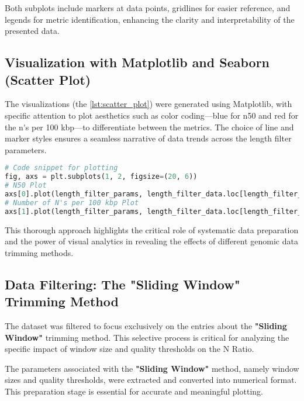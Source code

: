 Both subplots include markers at data points, gridlines for easier reference, and legends for metric identification, enhancing the clarity and interpretability of the presented data.

\subsection{Visualization with Matplotlib and Seaborn (Scatter Plot)} \label{sec:length_filter_trimming_visualisation}
The visualizations (the \autoref{lst:scatter_plot}) were generated using Matplotlib, with specific attention to plot aesthetics such as color coding—blue for \gls{n50} and red for the \gls{n's per 100 kbp}—to differentiate between the \gls{metrics}. The choice of line and marker styles ensures a seamless narrative of data trends across the length filter parameters.

\begin{lstlisting}[language=Python, label={lst:scatter_plot}, caption=Scatter Plot Visualization of Metrics Variation]
# Code snippet for plotting
fig, axs = plt.subplots(1, 2, figsize=(20, 6))
# N50 Plot
axs[0].plot(length_filter_params, length_filter_data.loc[length_filter_sorted, 'N50'], marker='o', linestyle='-', color='blue', label='N50')
# Number of N's per 100 kbp Plot
axs[1].plot(length_filter_params, length_filter_data.loc[length_filter_sorted, "# N's per 100 kbp"], marker='o', linestyle='-', color='red', label="# N's per 100 kbp")
\end{lstlisting}

This thorough approach highlights the critical role of systematic data preparation and the power of visual analytics in revealing the effects of different genomic data \gls{trimming} methods.





\subsection{Data Filtering: The "Sliding Window" Trimming Method} \label{sec:sliding_window_trimming}
The dataset was filtered to focus exclusively on the entries about the \textbf{"Sliding Window"} \gls{trimming} method. This selective process is critical for analyzing the specific impact of window size and quality thresholds on the N Ratio.

The parameters associated with the \textbf{"Sliding Window"} method, namely window sizes and quality thresholds, were extracted and converted into numerical format. This preparation stage is essential for accurate and meaningful plotting.


